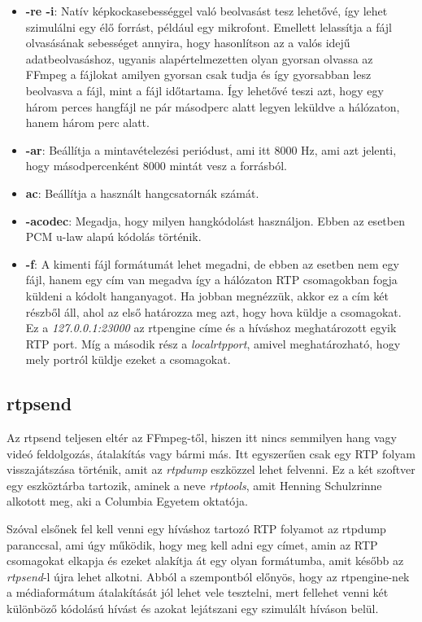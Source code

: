 \begin{itemize}
	\item \textbf{-re -i}: Natív képkockasebességgel való beolvasást tesz lehetővé, 
	így lehet szimulálni egy élő forrást, például egy mikrofont. Emellett lelassítja
	a fájl olvasásának sebességet annyira, hogy hasonlítson az a valós idejű
	adatbeolvasáshoz, ugyanis alapértelmezetten olyan gyorsan olvassa az FFmpeg a
	fájlokat amilyen gyorsan csak tudja és így gyorsabban lesz beolvasva a fájl,
	mint a fájl időtartama. 
	Így lehetővé teszi azt, hogy egy három perces hangfájl ne pár másodperc alatt 
	legyen leküldve a hálózaton, hanem három perc alatt. 
	\item \textbf{-ar}: Beállítja a mintavételezési periódust, ami itt 8000 Hz, ami 
	azt jelenti, hogy másodpercenként 8000 mintát vesz a forrásból. 
	\item \textbf{ac}: Beállítja a használt hangcsatornák számát.
	\item \textbf{-acodec}: Megadja, hogy milyen hangkódolást használjon. Ebben az 
	esetben PCM u-law alapú kódolás történik.
	\item \textbf{-f}: A kimenti fájl formátumát lehet megadni, de ebben az esetben
	nem egy fájl, hanem egy cím van megadva így a hálózaton RTP csomagokban fogja 
	küldeni a kódolt hanganyagot. Ha jobban megnézzük, akkor ez a cím két részből áll,
	ahol az első határozza meg azt, hogy hova küldje a csomagokat. Ez a 
	\textit{127.0.0.1:23000} az rtpengine címe és a híváshoz meghatározott egyik RTP
	port. Míg a második rész a \textit{localrtpport}, amivel meghatározható, hogy
	mely portról küldje ezeket a csomagokat.
\end{itemize}

\subsection{rtpsend}

Az rtpsend teljesen eltér az FFmpeg-től, hiszen itt nincs semmilyen hang vagy videó
feldolgozás, átalakítás vagy bármi más. Itt egyszerűen csak egy RTP folyam visszajátszása
történik, amit az \textit{rtpdump} eszközzel lehet felvenni. Ez a két szoftver egy 
eszköztárba tartozik, aminek a neve \textit{rtptools}, amit Henning Schulzrinne
alkotott meg, aki a Columbia Egyetem oktatója.

Szóval elsőnek fel kell venni egy híváshoz tartozó RTP folyamot az rtpdump paranccsal,
ami úgy működik, hogy meg kell adni egy címet, amin az RTP csomagokat elkapja és 
ezeket alakítja át egy olyan formátumba, amit később az \textit{rtpsend}-l újra
lehet alkotni. Abból a szempontból előnyös, hogy az rtpengine-nek a médiaformátum
átalakítását jól lehet vele tesztelni, mert fellehet venni két különböző kódolású
hívást és azokat lejátszani egy szimulált híváson belül.

